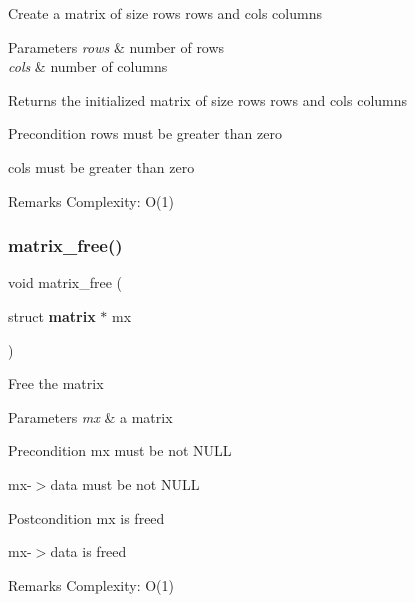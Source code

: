 Create a matrix of size {\ttfamily rows} rows and {\ttfamily cols} columns


\begin{DoxyParams}{Parameters}
{\em rows} & number of rows \\
\hline
{\em cols} & number of columns\\
\hline
\end{DoxyParams}
\begin{DoxyReturn}{Returns}
the initialized matrix of size {\ttfamily rows} rows and {\ttfamily cols} columns
\end{DoxyReturn}
\begin{DoxyPrecond}{Precondition}
{\ttfamily rows} must be greater than zero 

{\ttfamily cols} must be greater than zero
\end{DoxyPrecond}
\begin{DoxyRemark}{Remarks}
Complexity\+: O(1) 
\end{DoxyRemark}
\mbox{\label{matrix_8h_ac19cd61ef9f183a9b92d6789399f8646}} 
\subsubsection{matrix\+\_\+free()}
{\footnotesize\ttfamily void matrix\+\_\+free (\begin{DoxyParamCaption}\item[{struct \textbf{ matrix} $\ast$}]{mx }\end{DoxyParamCaption})\hspace{0.3cm}{\ttfamily [inline]}}

Free the matrix


\begin{DoxyParams}{Parameters}
{\em mx} & a matrix\\
\hline
\end{DoxyParams}
\begin{DoxyPrecond}{Precondition}
{\ttfamily mx} must be not N\+U\+LL 

{\ttfamily mx-\/$>$data} must be not N\+U\+LL
\end{DoxyPrecond}
\begin{DoxyPostcond}{Postcondition}
{\ttfamily mx} is freed 

{\ttfamily mx-\/$>$data} is freed
\end{DoxyPostcond}
\begin{DoxyRemark}{Remarks}
Complexity\+: O(1) 
\end{DoxyRemark}
\mbox{\label{matrix_8h_a846b4db55574ffabe64ff0604070bde1}} 
